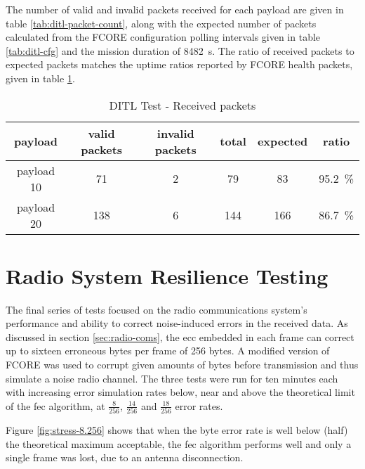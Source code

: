 The number of valid and invalid packets received for each payload are given in
table \ref{tab:ditl-packet-count}, along with the expected number of packets
calculated from the FCORE configuration polling intervals given in table
\ref{tab:ditl-cfg} and the mission duration of \SI{8482}{\second}. The ratio of
received packets to expected packets matches the uptime ratios reported by
FCORE health packets, given in table \ref{tab:ditl-health}.

\begin{table}[h]
\begin{center}
\begin{tabular}{c||c c|c c|c}

payload & valid packets & invalid packets & total & expected & ratio \\
\hline
payload 10 & 71 & 2 & 79 & 83 & \SI{95.2}{\percent} \\
payload 20 & 138 & 6 & 144 & 166 & \SI{86.7}{\percent} \\

\end{tabular}
\end{center}
\caption {DITL Test - Received packets}
\label{tab:ditl-health}
\end{table}

\section{Radio System Resilience Testing}
\label{ssec:results-resilience}

The final series of tests focused on the radio communications system's
performance and ability to correct noise-induced errors in the received data.
As discussed in section \ref{sec:radio-coms}, the \acrfull{ecc} embedded in
each frame can correct up to sixteen erroneous bytes per frame of 256 bytes.
A modified version of FCORE was used to corrupt given amounts of bytes before
transmission and thus simulate a noise radio channel. The three tests were run
for ten minutes each with increasing error simulation rates below, near and
above the theoretical limit of the \acrshort{fec} algorithm, at $\frac{8}{256}$,
$\frac{14}{256}$ and $\frac{18}{256}$ error rates.

Figure \ref{fig:stress-8.256} shows that when the byte error rate is well below
(half) the theoretical maximum acceptable, the \acrshort{fec} algorithm performs
well and only a single frame was lost, due to an antenna disconnection.

